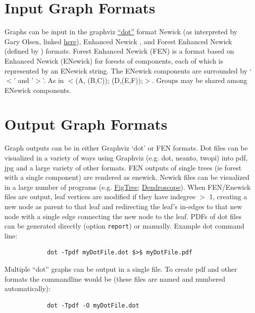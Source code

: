 \documentclass[11pt]{book}
\begin{document}
{{	\section{Input Graph Formats}
	Graphs can be input in the graphviz \href{https://graphviz.org/}{``dot''} format Newick (as 		
	interpreted by Gary Olsen, linked \href{https://evolution.genetics.washington.edu/phylip/newick_doc.html}
	{here}), Enhanced Newick \cite{Cardonaetal2008}, and Forest Enhanced Newick (defined by 
	\citealp{Wheeler2022}) formats.
	Forest Enhanced Newick (FEN) is a format based on Enhanced Newick (ENewick) for 
	forests of components, each of which is represented by an ENewick string. The ENewick 
	components are surrounded by `$<$' and '$>$'. As in $<$(A, (B,C)); (D,(E,F));$>$. 
	Groups may be shared among ENewick components.
	
	\section{Output Graph Formats}
	Graph outputs can be in either Graphviz `dot' or FEN formats. Dot files can be visualized in a variety of ways 
	using Graphviz (e.g. dot, neanto, twopi) into pdf, jpg and a large variety of other formats. FEN outputs of 
	single trees (ie forest with a single component) are rendered as enewick. Newick files can be visualized in a 
	large number of programs (e.g. \href{http://tree.bio.ed.ac.uk/software/figtree/}{FigTree}; 
	\href{http:/https://uni-tuebingen.de/fakultaeten/mathematisch-naturwissenschaftliche-fakultaet/fachbereiche/informatik/lehrstuehle/algorithms-in-bioinformatics/software/}
	{Dendroscope}). 	
	When FEN/Enewick files are output, leaf vertices are modified if they have indegree $>$ 1, creating a new node as parent to that leaf
	and redirecting the leaf's in-edges to that new node with a single edge connecting the new node to the leaf. PDFs of dot files can be generated directly (option \texttt{report}) or manually.  Example dot command line: 
	
		\begin{verbatim}
			dot -Tpdf myDotFile.dot $>$ myDotFile.pdf
		\end{verbatim}
		
	Multiple ``dot'' graphs can be output in a single file. To create pdf and other formats the
	commandline would be (these files are named and numbered automatically):
	
		\begin{verbatim}
			dot -Tpdf -O myDotFile.dot
		\end{verbatim}
		
}}
\end{document}

